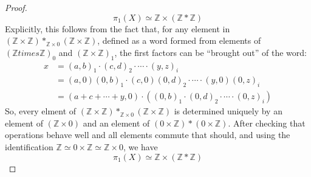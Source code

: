 \documentclass[12pt]{article}
\newcommand{\Z}{\mathbb{Z}}
\theoremstyle{definition}
\newenvironment{problem}[2][Problem]{\begin{trivlist}
\item[\hskip \labelsep {\bfseries #1}\hskip \labelsep {\bfseries #2.}]}{\end{trivlist}}
\begin{document}
\begin{problem}{1}
\begin{proof}
\[\pi_1(X) \simeq \Z \times (\Z * \Z) \]
Explicitly, this follows from the fact that, for any element in $(\Z \times \Z) *_{\Z \times 0} (\Z \times \Z)$, defined as a word formed from elements of $(\Z times \Z)_0$ and $(\Z \times \Z)_1$, the first factors can be ``brought out'' of the word:
\begin{align*} x &= (a,b)_1 \cdot (c, d)_2 \cdot \cdots \cdot (y, z)_i\\
&= (a,0)(0,b)_1 \cdot (c, 0)(0, d)_2 \cdot \cdots \cdot (y, 0)(0,z)_i\\
&= (a + c + \cdots + y, 0) \cdot \left ((0,b)_1 \cdot (0,d)_2 \cdot \cdots \cdot (0,z)_i\right )\end{align*}
So, every elment of $(\Z \times \Z) *_{\Z \times 0} (\Z \times \Z)$ is determined uniquely by an element of $(\Z \times 0)$ and an element of $(0 \times \Z) * (0 \times \Z)$. After checking that operations behave well and all elements commute that should, and using the identification $\Z \simeq 0 \times \Z \simeq \Z \times 0$, we have
\[\pi_1(X) \simeq \Z \times (\Z * \Z)\]
\end{proof}
\end{problem}
\end{document}

